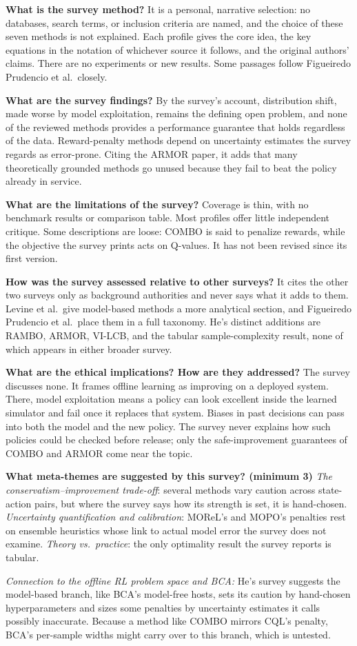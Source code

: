 \documentclass[11pt]{article}
\newcommand{\q}[2]{\item \textbf{#1} #2}
\newcommand{\tiein}[1]{\par\smallskip\noindent\emph{Connection to the offline RL problem space and BCA:} #1\par\medskip}
\begin{document}
\begin{qna}
\q{What is the survey method?}
It is a personal, narrative selection: no databases, search terms, or inclusion criteria are named, and the choice of these seven methods is not explained. Each profile gives the core idea, the key equations in the notation of whichever source it follows, and the original authors' claims. There are no experiments or new results. Some passages follow Figueiredo Prudencio et al.\ closely.

\q{What are the survey findings?}
By the survey's account, distribution shift, made worse by model exploitation, remains the defining open problem, and none of the reviewed methods provides a performance guarantee that holds regardless of the data. Reward-penalty methods depend on uncertainty estimates the survey regards as error-prone. Citing the ARMOR paper, it adds that many theoretically grounded methods go unused because they fail to beat the policy already in service.

\q{What are the limitations of the survey?}
Coverage is thin, with no benchmark results or comparison table. Most profiles offer little independent critique. Some descriptions are loose: COMBO is said to penalize rewards, while the objective the survey prints acts on Q-values. It has not been revised since its first version.

\q{How was the survey assessed relative to other surveys?}
It cites the other two surveys only as background authorities and never says what it adds to them. Levine et al.\ give model-based methods a more analytical section, and Figueiredo Prudencio et al.\ place them in a full taxonomy. He's distinct additions are RAMBO, ARMOR, VI-LCB, and the tabular sample-complexity result, none of which appears in either broader survey.

\q{What are the ethical implications? How are they addressed?}
The survey discusses none. It frames offline learning as improving on a deployed system. There, model exploitation means a policy can look excellent inside the learned simulator and fail once it replaces that system. Biases in past decisions can pass into both the model and the new policy. The survey never explains how such policies could be checked before release; only the safe-improvement guarantees of COMBO and ARMOR come near the topic.

\q{What meta-themes are suggested by this survey? (minimum 3)}
\emph{The conservatism--improvement trade-off}: several methods vary caution across state-action pairs, but where the survey says how its strength is set, it is hand-chosen. \emph{Uncertainty quantification and calibration}: MOReL's and MOPO's penalties rest on ensemble heuristics whose link to actual model error the survey does not examine. \emph{Theory vs.\ practice}: the only optimality result the survey reports is tabular.

\end{qna}
\tiein{He's survey suggests the model-based branch, like BCA's model-free hosts, sets its caution by hand-chosen hyperparameters and sizes some penalties by uncertainty estimates it calls possibly inaccurate. Because a method like COMBO mirrors CQL's penalty, BCA's per-sample widths might carry over to this branch, which is untested.}
\end{document}
